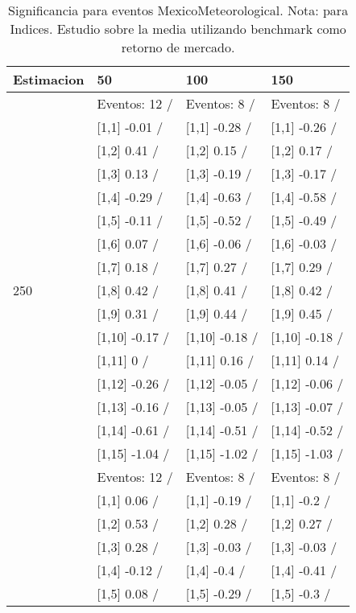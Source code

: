 \begin{table}

\caption{Significancia para eventos MexicoMeteorological. Nota: para Indices. Estudio sobre la media utilizando benchmark como retorno de mercado.}
\centering
\begin{tabular}[t]{llll}
\toprule
Estimacion & 50 & 100 & 150\\
\midrule
 & Eventos:  12 / & Eventos:  8 / & Eventos:  8 /\\
 & {}[1,1] -0.01  / & {}[1,1] -0.28  / & {}[1,1] -0.26  /\\
 & {}[1,2] 0.41  / & {}[1,2] 0.15  / & {}[1,2] 0.17  /\\
 & {}[1,3] 0.13  / & {}[1,3] -0.19  / & {}[1,3] -0.17  /\\
 & {}[1,4] -0.29  / & {}[1,4] -0.63  / & {}[1,4] -0.58  /\\
\addlinespace
 & {}[1,5] -0.11  / & {}[1,5] -0.52  / & {}[1,5] -0.49  /\\
 & {}[1,6] 0.07  / & {}[1,6] -0.06  / & {}[1,6] -0.03  /\\
 & {}[1,7] 0.18  / & {}[1,7] 0.27  / & {}[1,7] 0.29  /\\
250 & {}[1,8] 0.42  / & {}[1,8] 0.41  / & {}[1,8] 0.42  /\\
 & {}[1,9] 0.31  / & {}[1,9] 0.44  / & {}[1,9] 0.45  /\\
\addlinespace
 & {}[1,10] -0.17  / & {}[1,10] -0.18  / & {}[1,10] -0.18  /\\
 & {}[1,11] 0  / & {}[1,11] 0.16  / & {}[1,11] 0.14  /\\
 & {}[1,12] -0.26  / & {}[1,12] -0.05  / & {}[1,12] -0.06  /\\
 & {}[1,13] -0.16  / & {}[1,13] -0.05  / & {}[1,13] -0.07  /\\
 & {}[1,14] -0.61  / & {}[1,14] -0.51  / & {}[1,14] -0.52  /\\
\addlinespace
 & {}[1,15] -1.04  / & {}[1,15] -1.02  / & {}[1,15] -1.03  /\\
 & Eventos:  12 / & Eventos:  8 / & Eventos:  8 /\\
 & {}[1,1] 0.06  / & {}[1,1] -0.19  / & {}[1,1] -0.2  /\\
 & {}[1,2] 0.53  / & {}[1,2] 0.28  / & {}[1,2] 0.27  /\\
 & {}[1,3] 0.28  / & {}[1,3] -0.03  / & {}[1,3] -0.03  /\\
\addlinespace
 & {}[1,4] -0.12  / & {}[1,4] -0.4  / & {}[1,4] -0.41  /\\
 & {}[1,5] 0.08  / & {}[1,5] -0.29  / & {}[1,5] -0.3  /\\

\end{tabular}
\end{table}
